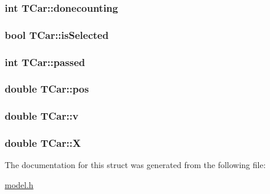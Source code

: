 \subsubsection[{\texorpdfstring{donecounting}{donecounting}}]{\setlength{\rightskip}{0pt plus 5cm}int T\+Car\+::donecounting}\hypertarget{struct_t_car_a5dc6b6e98dc6b579e3c03066e6f85e41}{}\label{struct_t_car_a5dc6b6e98dc6b579e3c03066e6f85e41}
\subsubsection[{\texorpdfstring{is\+Selected}{isSelected}}]{\setlength{\rightskip}{0pt plus 5cm}bool T\+Car\+::is\+Selected}\hypertarget{struct_t_car_a31e5e550847ac32e69ae8e349e3fb284}{}\label{struct_t_car_a31e5e550847ac32e69ae8e349e3fb284}
\subsubsection[{\texorpdfstring{passed}{passed}}]{\setlength{\rightskip}{0pt plus 5cm}int T\+Car\+::passed}\hypertarget{struct_t_car_a2570c12a3c93fe749cc3c48bb1cedde2}{}\label{struct_t_car_a2570c12a3c93fe749cc3c48bb1cedde2}
\subsubsection[{\texorpdfstring{pos}{pos}}]{\setlength{\rightskip}{0pt plus 5cm}double T\+Car\+::pos}\hypertarget{struct_t_car_a90e6fa494374d52326e298a106a90ea2}{}\label{struct_t_car_a90e6fa494374d52326e298a106a90ea2}
\subsubsection[{\texorpdfstring{v}{v}}]{\setlength{\rightskip}{0pt plus 5cm}double T\+Car\+::v}\hypertarget{struct_t_car_af757ff36edd338d56a61e8b6d7fd7cf3}{}\label{struct_t_car_af757ff36edd338d56a61e8b6d7fd7cf3}
\subsubsection[{\texorpdfstring{X}{X}}]{\setlength{\rightskip}{0pt plus 5cm}double T\+Car\+::X}\hypertarget{struct_t_car_a3847ee9ca0df36a71e723acb0527e444}{}\label{struct_t_car_a3847ee9ca0df36a71e723acb0527e444}


The documentation for this struct was generated from the following file\+:\begin{DoxyCompactItemize}
\item 
\hyperlink{model_8h}{model.\+h}\end{DoxyCompactItemize}
